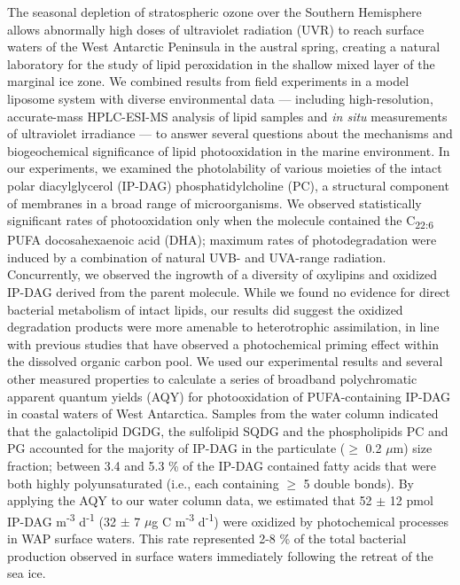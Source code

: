 The seasonal depletion of stratospheric ozone over the Southern Hemisphere allows abnormally high doses of ultraviolet radiation (UVR) to reach surface waters of the West Antarctic Peninsula in the austral spring, creating a natural laboratory for the study of lipid peroxidation in the shallow mixed layer of the marginal ice zone. We combined results from field experiments in a model liposome system with diverse environmental data --- including high-resolution, accurate-mass HPLC-ESI-MS analysis of lipid samples and \emph{in situ} measurements of ultraviolet irradiance --- to answer several questions about the mechanisms and biogeochemical significance of lipid photooxidation in the marine environment. In our experiments, we examined the photolability of various moieties of the intact polar diacylglycerol (IP-DAG) phosphatidylcholine (PC), a structural component of membranes in a broad range of microorganisms. We observed statistically significant rates of photooxidation only when the molecule contained the C\textsubscript{22:6} PUFA docosahexaenoic acid (DHA); maximum rates of photodegradation were induced by a combination of natural UVB- and UVA-range radiation. Concurrently, we observed the ingrowth of a diversity of oxylipins and oxidized IP-DAG derived from the parent molecule. While we found no evidence for direct bacterial metabolism of intact lipids, our results did suggest the oxidized degradation products were more amenable to heterotrophic assimilation, in line with previous studies that have observed a photochemical priming effect within the dissolved organic carbon pool. We used our experimental results and several other measured properties to calculate a series of broadband polychromatic apparent quantum yields (AQY) for photooxidation of PUFA-containing IP-DAG in coastal waters of West Antarctica. Samples from the water column indicated that the galactolipid DGDG, the sulfolipid SQDG and the phospholipids PC and PG accounted for the majority of IP-DAG in the particulate ($\geq$ 0.2 $\mu$m) size fraction; between 3.4 and 5.3 \% of the IP-DAG contained fatty acids that were both highly polyunsaturated (i.e., each containing $\geq$ 5 double bonds). By applying the AQY to our water column data, we estimated that 52 $\pm$ 12 pmol IP-DAG m\textsuperscript{-3} d\textsuperscript{-1} (32 $\pm$ 7 $\mu$g C m\textsuperscript{-3} d\textsuperscript{-1}) were oxidized by photochemical processes in WAP surface waters. This rate represented 2-8 \% of the total bacterial production observed in surface waters immediately following the retreat of the sea ice.
\clearpage

